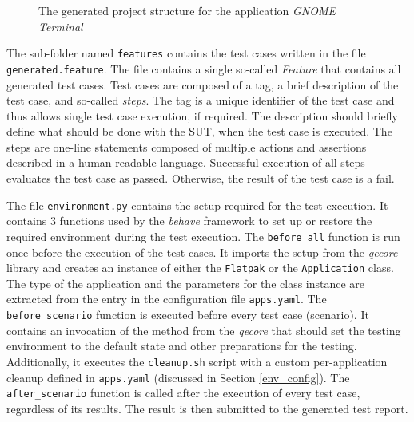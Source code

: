 \begin{figure}[H]
\caption{The generated project structure for the application \textit{GNOME Terminal}}
\label{project_folder}
\end{figure}

The sub-folder named \texttt{features} contains the test cases written in the file \texttt{generated.feature}. The file contains a single so-called \textit{Feature} that contains all generated test cases. Test cases are composed of a tag, a brief description of the test case, and so-called \textit{steps}. The tag is a unique identifier of the test case and thus allows single test case execution, if required. The description should briefly define what should be done with the SUT, when the test case is executed. The steps are one-line statements composed of multiple actions and assertions described in a human-readable language. Successful execution of all steps evaluates the test case as passed. Otherwise, the result of the test case is a fail.

The file \texttt{environment.py} contains the setup required for the test execution. It contains 3 functions used by the \textit{behave} framework to set up or restore the required environment during the test execution. The \texttt{before\_all} function is run once before the execution of the test cases. It imports the setup from the \textit{qecore} library and creates an instance of either the \texttt{Flatpak} or the \texttt{Application} class. The type of the application and the parameters for the class instance are extracted from the entry in the configuration file \texttt{apps.yaml}. The \texttt{before\_scenario} function is executed before every test case (scenario). It contains an invocation of the method from the \textit{qecore} that should set the testing environment to the default state and other preparations for the testing. Additionally, it executes the \texttt{cleanup.sh} script with a custom per-application cleanup defined in \texttt{apps.yaml} (discussed in Section \ref{env_config}). The \texttt{after\_scenario} function is called after the execution of every test case, regardless of its results. The result is then submitted to the generated test report.

